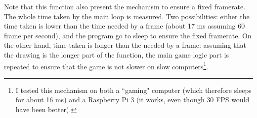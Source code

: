 \documentclass[12pt,a4paper]{article}
\newcommand{\cc}[1]{\texttt{#1}}
\begin{document}
Note that this function also present the mechanism to ensure a fixed framerate. The whole time taken by the main loop is measured. Two possibilities: either the time taken is lower than the time needed by a frame (about 17 ms assuming 60 frame per second), and the program go to sleep to ensure the fixed framerate. On the other hand, time taken is longer than the needed by a frame: assuming that the drawing is the longer part of the function, the main game logic part is repeated to ensure that the game is not slower on slow computers\footnote{I tested this mechanism on both a ``gaming" computer (which therefore sleeps for about 16 ms) and a Raspberry Pi 3 (it works, even though 30 FPS would have been better).}.

%
%
%
%
\end{document}
